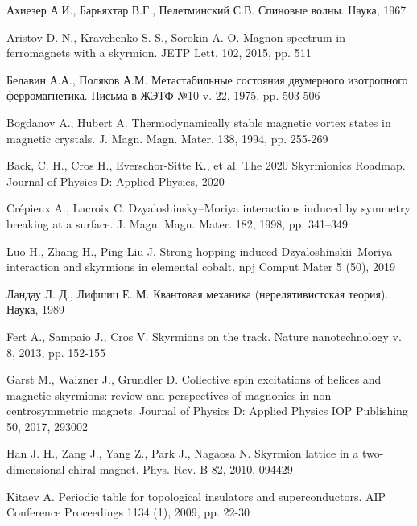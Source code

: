 \documentclass[a4paper,article,14pt]{extarticle}
\begin{document}
\pagebreak
\begin{thebibliography}{1}
 Ахиезер А.И., Барьяхтар В.Г., Пелетминский С.В. \flqq Спиновые волны\frqq. Наука, 1967

 Aristov D. N., Kravchenko S. S., Sorokin A. O. \flqq Magnon spectrum in ferromagnets with a skyrmion\frqq. JETP Lett. 102, 2015, pp. 511

 Белавин А.А., Поляков А.М. \flqq Метастабильные состояния двумерного изотропного ферромагнетика\frqq. Письма в ЖЭТФ №10 v. 22, 1975, pp. 503-506

 Bogdanov A., Hubert A. \flqq Thermodynamically stable magnetic vortex states in magnetic crystals\frqq. J. Magn. Magn. Mater. 138, 1994, pp. 255-269
 
 Back, C. H., Cros H., Everschor-Sitte K., et al. \flqq The 2020 Skyrmionics Roadmap\frqq. Journal of Physics D: Applied Physics, 2020

 Crépieux A., Lacroix C. \flqq Dzyaloshinsky–Moriya interactions induced by symmetry breaking at a surface\frqq.  J. Magn. Magn. Mater. 182, 1998, pp. 341–349

 Luo H., Zhang H., Ping Liu J. \flqq Strong hopping induced Dzyaloshinskii–Moriya interaction and skyrmions in elemental cobalt\frqq. npj Comput Mater 5 (50), 2019

 Ландау Л. Д., Лифшиц Е. М. \flqq Квантовая механика (нерелятивистская теория)\frqq. Наука, 1989

 Fert A., Sampaio J., Cros V. \flqq Skyrmions on the track\frqq. Nature nanotechnology v. 8, 2013, pp. 152-155

 Garst M., Waizner J., Grundler D.  \flqq Collective spin excitations of helices and magnetic skyrmions: review and perspectives of magnonics in non-centrosymmetric magnets\frqq. Journal of Physics D: Applied Physics IOP Publishing 50, 2017, 293002

 Han J. H., Zang J., Yang  Z., Park J., Nagaosa N. \flqq Skyrmion lattice in a two-dimensional chiral magnet\frqq. Phys. Rev. B 82, 2010, 094429

 Kitaev  A. \flqq Periodic table for topological insulators and superconductors\frqq. AIP Conference Proceedings 1134 (1), 2009, pp. 22-30


\end{thebibliography}
\end{document}
